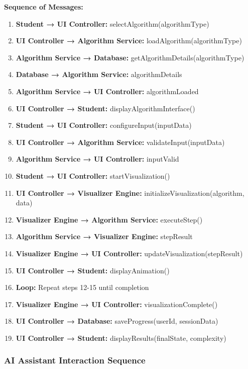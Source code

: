 \textbf{Sequence of Messages:}

\begin{enumerate}
    \item \textbf{Student → UI Controller:} selectAlgorithm(algorithmType)
    \item \textbf{UI Controller → Algorithm Service:} loadAlgorithm(algorithmType)
    \item \textbf{Algorithm Service → Database:} getAlgorithmDetails(algorithmType)
    \item \textbf{Database → Algorithm Service:} algorithmDetails
    \item \textbf{Algorithm Service → UI Controller:} algorithmLoaded
    \item \textbf{UI Controller → Student:} displayAlgorithmInterface()
    \item \textbf{Student → UI Controller:} configureInput(inputData)
    \item \textbf{UI Controller → Algorithm Service:} validateInput(inputData)
    \item \textbf{Algorithm Service → UI Controller:} inputValid
    \item \textbf{Student → UI Controller:} startVisualization()
    \item \textbf{UI Controller → Visualizer Engine:} initializeVisualization(algorithm, data)
    \item \textbf{Visualizer Engine → Algorithm Service:} executeStep()
    \item \textbf{Algorithm Service → Visualizer Engine:} stepResult
    \item \textbf{Visualizer Engine → UI Controller:} updateVisualization(stepResult)
    \item \textbf{UI Controller → Student:} displayAnimation()
    \item \textbf{Loop:} Repeat steps 12-15 until completion
    \item \textbf{Visualizer Engine → UI Controller:} visualizationComplete()
    \item \textbf{UI Controller → Database:} saveProgress(userId, sessionData)
    \item \textbf{UI Controller → Student:} displayResults(finalState, complexity)
\end{enumerate}

\subsubsection{AI Assistant Interaction Sequence}

